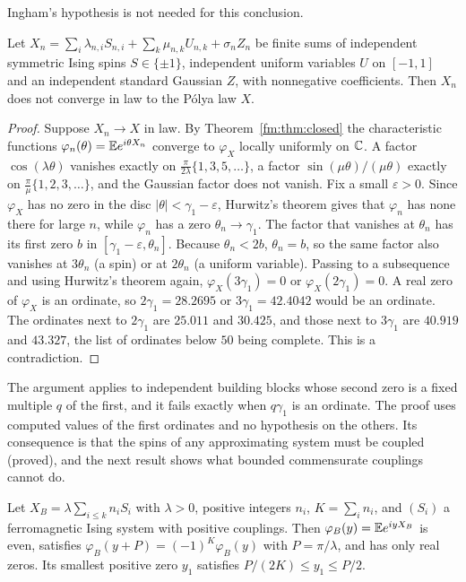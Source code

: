 Ingham's hypothesis is not needed for this conclusion.

\begin{proposition}[proved]\label{fm:prop:indep}
Let $X_n=\sum_i\lambda_{n,i}S_{n,i}+\sum_k\mu_{n,k}U_{n,k}+\sigma_nZ_n$ be finite sums of independent symmetric Ising spins $S\in\{\pm1\}$, independent uniform variables $U$ on $[-1,1]$ and an independent standard Gaussian $Z$, with nonnegative coefficients. Then $X_n$ does not converge in law to the P\'olya law $X$.
\end{proposition}

\begin{proof}
Suppose $X_n\to X$ in law. By Theorem~\ref{fm:thm:closed} the characteristic functions $\varphi_n(\theta)=\mathbb{E} e^{i\theta X_n}$ converge to $\varphi_X$ locally uniformly on $\mathbb{C}$. A factor $\cos(\lambda\theta)$ vanishes exactly on $\frac{\pi}{2\lambda}\{1,3,5,\dots\}$, a factor $\sin(\mu\theta)/(\mu\theta)$ exactly on $\frac{\pi}{\mu}\{1,2,3,\dots\}$, and the Gaussian factor does not vanish. Fix a small $\varepsilon>0$. Since $\varphi_X$ has no zero in the disc $|\theta|<\gamma_1-\varepsilon$, Hurwitz's theorem gives that $\varphi_n$ has none there for large $n$, while $\varphi_n$ has a zero $\theta_n\to\gamma_1$. The factor that vanishes at $\theta_n$ has its first zero $b$ in $[\gamma_1-\varepsilon,\theta_n]$. Because $\theta_n<2b$, $\theta_n=b$, so the same factor also vanishes at $3\theta_n$ (a spin) or at $2\theta_n$ (a uniform variable). Passing to a subsequence and using Hurwitz's theorem again, $\varphi_X(3\gamma_1)=0$ or $\varphi_X(2\gamma_1)=0$. A real zero of $\varphi_X$ is an ordinate, so $2\gamma_1=28.2695$ or $3\gamma_1=42.4042$ would be an ordinate. The ordinates next to $2\gamma_1$ are $25.011$ and $30.425$, and those next to $3\gamma_1$ are $40.919$ and $43.327$, the list of ordinates below $50$ being complete. This is a contradiction.
\end{proof}

The argument applies to independent building blocks whose second zero is a fixed multiple $q$ of the first, and it fails exactly when $q\gamma_1$ is an ordinate. The proof uses computed values of the first ordinates and no hypothesis on the others. Its consequence is that the spins of any approximating system must be coupled (proved), and the next result shows what bounded commensurate couplings cannot do.

\begin{lemma}[proved]\label{fm:lem:block}
Let $X_B=\lambda\sum_{i\le k}n_iS_i$ with $\lambda>0$, positive integers $n_i$, $K=\sum_in_i$, and $(S_i)$ a ferromagnetic Ising system with positive couplings. Then $\varphi_B(y)=\mathbb{E} e^{iyX_B}$ is even, satisfies $\varphi_B(y+P)=(-1)^K\varphi_B(y)$ with $P=\pi/\lambda$, and has only real zeros. Its smallest positive zero $y_1$ satisfies $P/(2K)\le y_1\le P/2$.
\end{lemma}

